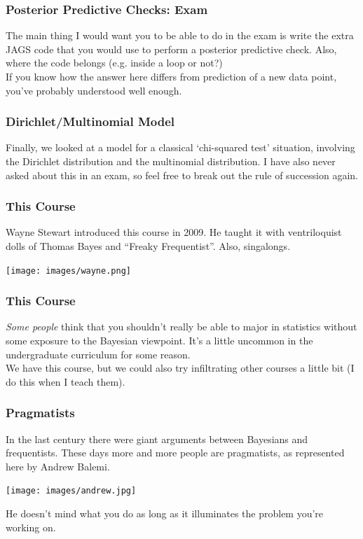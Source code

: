 \documentclass{beamer}
\begin{document}
\begin{frame}
\frametitle{Posterior Predictive Checks: Exam}
The main thing I would want you to be able to do in the exam is write the
extra JAGS code that you would use to perform a posterior predictive check.
Also, where the code belongs (e.g. inside a loop or not?)\pause\\[0.5em]

If you know how the answer here differs from prediction of a new data point,
you've probably understood well enough.
\end{frame}

\begin{frame}
\frametitle{Dirichlet/Multinomial Model}
Finally, we looked at a model for a classical `chi-squared test' situation,
involving the Dirichlet distribution and the multinomial distribution.
I have also never asked about this in an exam, so feel free to break out the
rule of succession again.

\end{frame}

\begin{frame}
\frametitle{This Course}
Wayne Stewart introduced this course in 2009. He taught it with ventriloquist
dolls of Thomas Bayes and ``Freaky Frequentist''. Also, singalongs.

\centering
\texttt{[image: images/wayne.png]}

\end{frame}


\begin{frame}
\frametitle{This Course}
{\em Some people} think that you shouldn't really be able to major in statistics
without some exposure to the Bayesian viewpoint. It's a little uncommon in
the undergraduate curriculum for some reason.\pause\\[0.5em]

We have this course, but we could also try infiltrating other courses a little
bit (I do this when I teach them).

\end{frame}


\begin{frame}
\frametitle{Pragmatists}
In the last century there were giant arguments between Bayesians and frequentists.
These days more and more people are pragmatists, as represented here by
Andrew Balemi.

\begin{center}
\texttt{[image: images/andrew.jpg]}
\end{center}

He doesn't mind what you do as long as it illuminates the problem you're working
on. 


\end{frame}
\end{document}
